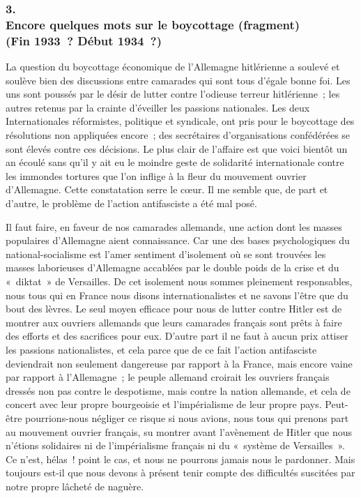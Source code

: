 \documentclass[french,twoside]{book} %
\begin{document}
\subsubsection[3. Encore quelques mots sur le boycottage (fragment) (Fin 1933 ? Début 1934 ?)]{3. \\
Encore quelques mots sur le boycottage (fragment) \\
(Fin 1933 ? Début 1934 ?)}
\noindent \par
La question du boycottage économique de l'Allemagne hitlérienne a soulevé et soulève bien des discussions entre camarades qui sont tous d'égale bonne foi. Les uns sont poussés par le désir de lutter contre l'odieuse terreur hitlérienne ; les autres retenus par la crainte d'éveiller les passions nationales. Les deux Internationales réformistes, politique et syndicale, ont pris pour le boycottage des résolutions non appliquées encore ; des secrétaires d'organisa­tions confédérées se sont élevés contre ces décisions. Le plus clair de l'affaire est que voici bientôt un an écoulé sans qu'il y ait eu le moindre geste de solidarité internationale contre les immondes tortures que l'on inflige à la fleur du mouvement ouvrier d'Allemagne. Cette constatation serre le cœur. Il me semble que, de part et d'autre, le problème de l'action antifasciste a été mal posé.\par
Il faut faire, en faveur de nos camarades allemands, une action dont les masses populaires d'Allemagne aient connaissance. Car une des bases psycho­logiques du national-socialisme est l'amer sentiment d'isolement où se sont trouvées les masses laborieuses d'Allemagne accablées par le double poids de la crise et du « diktat » de Versailles. De cet isolement nous sommes pleine­ment responsables, nous tous qui en France nous disons internationa­listes et ne savons l'être que du bout des lèvres. Le seul moyen efficace pour nous de lutter contre Hitler est de montrer aux ouvriers allemands que leurs camarades français sont prêts à faire des efforts et des sacrifices pour eux. D'autre part il ne faut à aucun prix attiser les passions nationalistes, et cela parce que de ce fait l'action antifasciste deviendrait non seulement dangereuse par rapport à la France, mais encore vaine par rapport à l'Allemagne ; le peuple allemand croirait les ouvriers français dressés non pas contre le despotisme, mais contre la nation allemande, et cela de concert avec leur propre bourgeoisie et l'impé­rialisme de leur propre pays. Peut-être pourrions-nous négliger ce risque si nous avions, nous tous qui prenons part au mouvement ouvrier français, su montrer avant l'avènement de Hitler que nous n'étions solidaires ni de l'impérialisme français ni du « système de Versailles ». Ce n'est, hélas ! point le cas, et nous ne pourrons jamais nous le pardonner. Mais toujours est-il que nous devons à présent tenir compte des difficultés suscitées par notre propre lâcheté de naguère.\par
\end{document}
